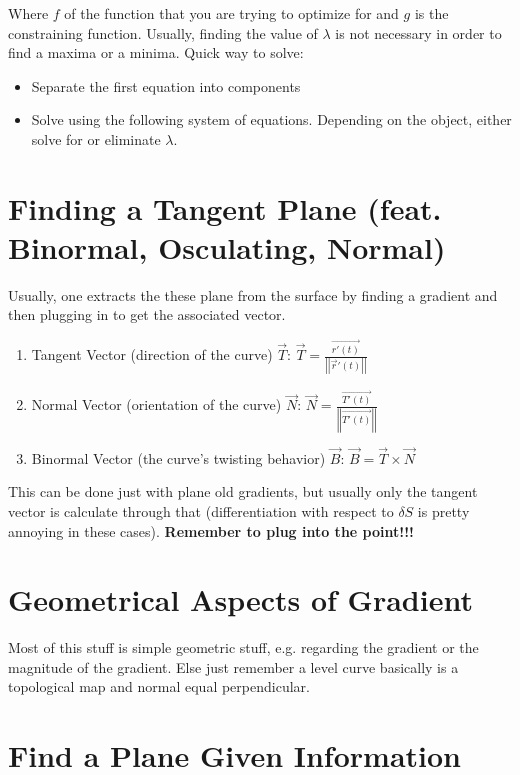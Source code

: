 \documentclass{article}
\begin{document}
Where $f$ of the function that you are trying to optimize for and $g$ is the constraining function. Usually, finding the value of $\lambda$ is not necessary in order to find a maxima or a minima. Quick way to solve:

\begin{itemize}
    \item Separate the first equation into components
    \item Solve using the following system of equations. Depending on the object, either solve for or eliminate $\lambda$.
\end{itemize}

\section{Finding a Tangent Plane (feat. Binormal, Osculating, Normal)}

Usually, one extracts the these plane from the surface by finding a gradient and then plugging in to get the associated vector.

\begin{enumerate}
    \item Tangent Vector (direction of the curve) $\vec{T}$: $\vec{T} = \frac{\vec{r'(t)}}{\left|\left|\vec{r}'(t)\right|\right|}$
    \item Normal Vector (orientation of the curve) $\vec{N}$: $\vec{N} = \frac{\vec{T'(t)}}{\left|\left|\vec{T'(t)}\right|\right|}$
    \item Binormal Vector (the curve's twisting behavior) $\vec{B}$: $\vec{B} = \vec{T} \times \vec{N}$
\end{enumerate}

This can be done just with plane old gradients, but usually only the tangent vector is calculate through that (differentiation with respect to $\delta S$ is pretty annoying in these cases). \textbf{Remember to plug into the point!!!}

\section{Geometrical Aspects of Gradient}

Most of this stuff is simple geometric stuff, e.g. regarding the gradient or the magnitude of the gradient. Else just remember a level curve basically is a topological map and normal equal perpendicular.

\section{Find a Plane Given Information}
\end{document}
